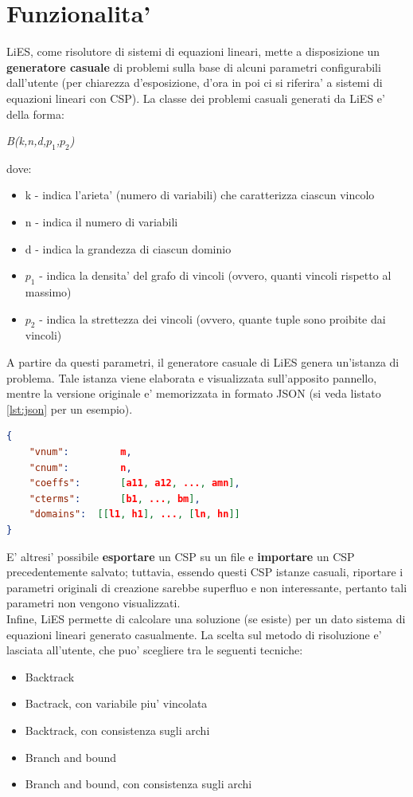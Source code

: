 \documentclass[10pt, a4paper]{article}
\begin{document}
\section{Funzionalita'}
\label{sec:funzionalita}

LiES, come risolutore di sistemi di equazioni lineari, mette a disposizione un \textbf{generatore casuale} di problemi sulla base di alcuni parametri configurabili dall'utente (per chiarezza d'esposizione, d'ora in poi ci si riferira' a sistemi di equazioni lineari con CSP). La classe dei problemi casuali generati da LiES e' della forma:
\begin{center}
	\textit{B(k,n,d,$p_1$,$p_2$)}
\end{center}

dove:
\begin{itemize}
	\item k - indica l'arieta' (numero di variabili) che caratterizza ciascun vincolo
	\item n - indica il numero di variabili
	\item d - indica la grandezza di ciascun dominio
	\item $p_1$ - indica la densita' del grafo di vincoli (ovvero, quanti vincoli rispetto al massimo)
	\item $p_2$ - indica la strettezza dei vincoli (ovvero,	quante tuple sono proibite dai vincoli) 
\end{itemize}

A partire da questi parametri, il generatore casuale di LiES genera un'istanza di problema. Tale istanza viene elaborata e visualizzata sull'apposito pannello, mentre la versione originale e' memorizzata in formato JSON (si veda listato \ref{lst:json} per un esempio).

\begin{lstlisting}[language=json, caption=Rappresentazione in formato json di un sistema di equazioni lineari, label=lst:json]
{
	"vnum": 		m,
	"cnum":			n,
	"coeffs":		[a11, a12, ..., amn],
	"cterms":		[b1, ..., bm],
	"domains":	[[l1, h1], ..., [ln, hn]]
}
\end{lstlisting}


E' altresi' possibile \textbf{esportare} un CSP su un file e \textbf{importare} un CSP precedentemente salvato; tuttavia, essendo questi CSP istanze casuali, riportare i parametri originali di creazione sarebbe superfluo e non interessante, pertanto tali parametri non vengono visualizzati.\\

Infine, LiES permette di calcolare una soluzione (se esiste) per un dato sistema di equazioni lineari generato casualmente. La scelta sul metodo di risoluzione e' lasciata all'utente, che puo' scegliere tra le seguenti tecniche:
\begin{itemize}
	\item Backtrack
	\item Bactrack, con variabile piu' vincolata
	\item Backtrack, con consistenza sugli archi
	\item Branch and bound
	\item Branch and bound, con consistenza sugli archi
\end{itemize}
\end{document}
